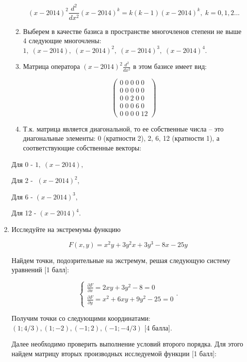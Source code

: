 \documentclass[pdftex,12pt,a4paper]{article}
\begin{document}
\begin{enumerate}
\begin{enumerate}
\[(x-2014)^{2} \frac{d^{2} }{dx^{2} } (x-2014)^{k} =k(k-1)(x-2014)^{k} ,\; k=0,1,2...\] 

\item  Выберем в качестве базиса в пространстве многочленов степени не выше 4 следующие многочлены: $1,\; (x-2014),\; (x-2014)^{2} ,\; (x-2014)^{3} ,\; (x-2014)^{4} $.

\item  Матрица оператора $(x-2014)^{2} \frac{d^{2} }{dx^{2} } $ в этом базисе имеет вид:

\[\left(\begin{array}{l} {0\; 0\; 0\; 0\; 0} \\ {0\; 0\; 0\; 0\; 0} \\ {0\; 0\; 2\; 0\; 0} \\ {0\; 0\; 0\; 6\; 0} \\ {0\; 0\; 0\; 0\; 12} \end{array}\right)\] 

\item  Т.к. матрица является диагональной, то ее собственные числа -- это диагональные элементы: 0 (кратности 2), 2, 6, 12 (кратности 1), а соответствующие собственные векторы:
\end{enumerate}

Для 0 - $1,\; (x-2014),\; $

Для 2 - $\; (x-2014)^{2} $,

Для 6 - $(x-2014)^{3} $,

Для 12 - $(x-2014)^{4} $.



\vspace{6pt}

\item  Исследуйте на экстремумы функцию

\[
F(x,y)=x^{2} y+3y^{2} x+3y^{3} -8x-25y
\]


\solution


Найдем точки, подозрительные на экстремум, решая следующую систему уравнений $[$1 балл]:

\[\left\{\begin{array}{c} {\frac{\partial F}{\partial x} =2xy+3y^{2} -8=0} \\ {\frac{\partial F}{\partial y} =x^{2} +6xy+9y^2-25=0} \end{array}\right. .\] 

Получим точки со следующими координатами: $\left(1;4/3\right),\left(1;-2\right),\left(-1;2\right),\left(-1;-4/3\right)$ $[$4 балла].

Далее необходимо проверить выполнение условий второго порядка. Для этого найдем матрицу вторых производных исследуемой функции $[$1 балл]:


\end{enumerate}
\end{document}
